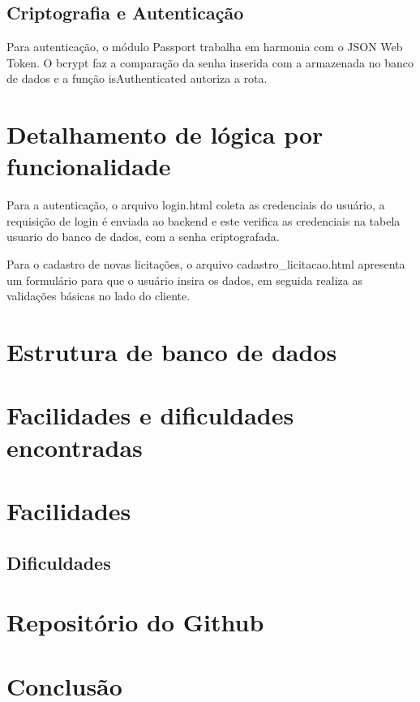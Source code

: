 \documentclass[ ]{article}
\begin{document}
			
		\subsection{Criptografia e Autenticação}
		Para autenticação, o módulo Passport trabalha em harmonia com o JSON Web Token. O bcrypt faz a comparação da senha inserida com a armazenada no banco de dados e a função isAuthenticated autoriza a rota.

	\section{Detalhamento de lógica por funcionalidade}
		Para a autenticação, o arquivo login.html coleta as credenciais do usuário, a requisição de login é enviada ao backend e este verifica as credenciais na tabela usuario do banco de dados, com a senha criptografada.
		
		Para o cadastro de novas licitações, o arquivo cadastro\_licitacao.html apresenta um formulário para que o usuário insira os dados, em seguida realiza as validações básicas no lado do cliente.
	\section{Estrutura de banco de dados}
	\section{Facilidades e dificuldades encontradas}
		\section{Facilidades}
		\subsection{Dificuldades}
	\section{Repositório do Github}
	\section{Conclusão}
	
\end{document}
